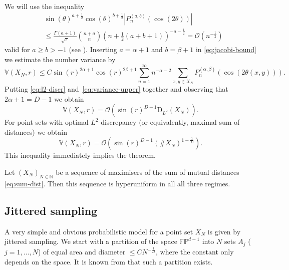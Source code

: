 We will use the inequality
\begin{equation}\label{eq:jacobi-bound}
  \begin{split}
    &\sin(\theta)^{a+\frac12}\cos(\theta)^{b+\frac12}
    |P_n^{(a,b)}(\cos(2\theta))|\\
    &\leq\frac{\Gamma(a+1)}{\sqrt\pi}
    \binom{n+a}n
    \left(n+\frac12(a+b+1)\right)^{-a-\frac12}
    =\mathcal{O}\left( n^{-\frac12}\right)
  \end{split}
\end{equation}
valid for $a\geq b>-1$ (see
\cite{Chow_Gatteschi_Wong1994:bernstein_type_inequality}). Inserting
$a=\alpha+1$ and $b=\beta+1$ in \eqref{eq:jacobi-bound} we estimate the number
variance by
\begin{equation}\label{eq:variance-upper}
  \mathbb{V}(X_N,r)\leq C\sin(r)^{2\alpha+1}\cos(r)^{2\beta+1}
  \sum_{n=1}^\infty n^{-\alpha-2}
  \sum_{x,y\in X_N}P_n^{(\alpha,\beta)}(\cos(2\theta(x,y))).
\end{equation}
Putting \eqref{eq:l2-discr} and~\eqref{eq:variance-upper} together and
observing that $2\alpha+1=D-1$ we obtain
\begin{equation}
  \label{eq:hyper}
  \mathbb{V}(X_N,r)=\mathcal{O}\left( \sin(r)^{D-1}\mathrm{D}_{L^2}(X_N)\right).
\end{equation}
For point sets with optimal $L^2$-discrepancy (or equivalently, maximal sum of
distances) we obtain
\begin{equation*}
  \mathbb{V}(X_N,r)=\mathcal{O}\left( \sin(r)^{D-1}(\#X_N)^{1-\frac1D}\right).
\end{equation*}
This inequality immediately implies the theorem.
\begin{theorem}
  Let $(X_N)_{N\in\mathbb{N}}$ be a sequence of maximisers of the sum of mutual
  distances \eqref{eq:sum-dist}. Then this sequence is hyperuniform in all all
  three regimes.
\end{theorem}
\subsection{Jittered sampling}\label{sec:jittered-sampling}
A very simple and obvious probabilistic model for a point set $X_N$ is given by
jittered sampling. We start with a partition of the space $\mathbb{FP}^{d-1}$
into $N$ sets $A_j$ ($j=1,\ldots,N$) of equal area and diameter
$\leq CN^{-\frac1D}$, where the constant only depends on the space. It is known
from \cite{Gigante_Leopardi2017:diameter_ahlfors} that such a partition exists.

